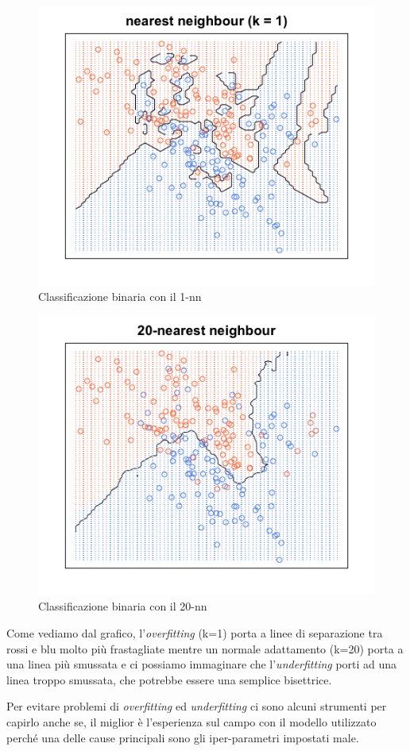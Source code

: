 \begin{figure}[H]
	\centering
	\includegraphics[width=0.7\linewidth]{img/1nearestneigh}
	\caption{Classificazione binaria con il 1-nn}
	\label{fig:1nearestneigh}
\end{figure}

\begin{figure}[H]
	\centering
	\includegraphics[width=0.7\linewidth]{img/20nearestneigh}
	\caption{Classificazione binaria con il 20-nn}
	\label{fig:20nearestneigh}
\end{figure}
Come vediamo dal grafico, l'\textit{overfitting} (k=1) porta a linee di separazione tra rossi e blu molto pi\`u  frastagliate mentre un normale adattamento (k=20) porta a una linea pi\`u  smussata e ci possiamo immaginare che l'\textit{underfitting} porti ad una linea troppo smussata, che potrebbe essere una semplice bisettrice.

Per evitare problemi di \textit{overfitting} ed \textit{underfitting} ci sono alcuni strumenti per capirlo anche se, il miglior \`e l'esperienza sul campo con il modello utilizzato perch\'e una delle cause principali sono gli iper-parametri impostati male.

